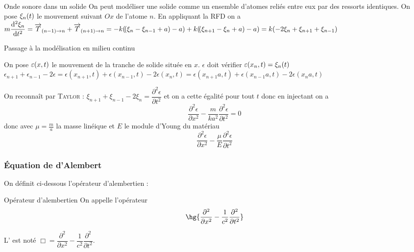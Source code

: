 \documentclass[a4paper,french,bookmarks]{book}
\begin{document}
    \begin{example}{Onde sonore dans un solide}{}
        On peut modéliser une solide comme un ensemble d'atomes reliés entre eux par des ressorts identiques. On pose $\xi_n\!\left(t\right)$ le mouvement suivant $Ox$ de l'atome $n$. En appliquant la RFD on a $m\dfrac{\mathrm d^2\xi_n}{\mathrm d t^2}=\overrightarrow{T}_{(n-1)\to n} + \overrightarrow{T}_{(n+1)\to n} = -k\!\left(\!\left(\xi_n - \xi_{n-1}+a\right)-a\right) + k\!\left(\!\left(\xi_{n+1}-\xi_n+a\right)-a\right) = k\!\left(-2\xi_n+\xi_{n+1}+\xi_{n-1}\right)$

        Passage à la modélisation en milieu continu

        On pose $\varepsilon\!\left(x,t\right)$ le mouvement de la tranche de solide située en $x$. $\epsilon$ doit vérifier $\varepsilon\!\left(x_n,t\right)=\xi_n\!\left(t\right)$
        $\epsilon_{n+1} + \epsilon_{n-1} - 2\epsilon = \epsilon(x_{n+1},t) + \epsilon(x_{n-1},t) - 2\epsilon(x_n,t) = \epsilon(x_{n+1}a,t) + \epsilon(x_{n-1}a,t) - 2\epsilon(x_na,t)$

        On reconnaît par \textsc{Taylor} : $\xi_{n+1}+\xi_{n-1}-2\xi_n=\dfrac{\partial^2\epsilon}{\partial t^2}$ et on a cette égalité pour tout $t$ donc en injectant on a 
        \[\dfrac{\partial^2\epsilon}{\partial x^2} -\dfrac{m}{ka^2}\dfrac{\partial^2\epsilon}{\partial t^2} = 0 \]
        donc avec $\mu=\frac{m}{a}$ la masse linéique et $E$ le module d'Young du matériau 
        \[\dfrac{\partial^2\epsilon}{\partial x^2} -\dfrac{\mu}{E}\dfrac{\partial^2\epsilon}{\partial t^2}\]
    \end{example}
    
    \subsubsection{Équation de d'Alembert}
    
    On définit ci-dessous l'opérateur d'alembertien :
    
    \begin{definition}{Opérateur d'alembertien}{}
        On appelle  l'opérateur 
        \[ \hg{\dfrac{\partial^2}{\partial x^2} - \dfrac{1}{c^2}\dfrac{\partial^2}{\partial t^2}}\]
    \end{definition}
    \begin{notation}
        L' est noté $\Box = \dfrac{\partial^2}{\partial x^2} - \dfrac{1}{c^2}\dfrac{\partial^2}{\partial t^2}$.
    \end{notation}
    
\end{document}
